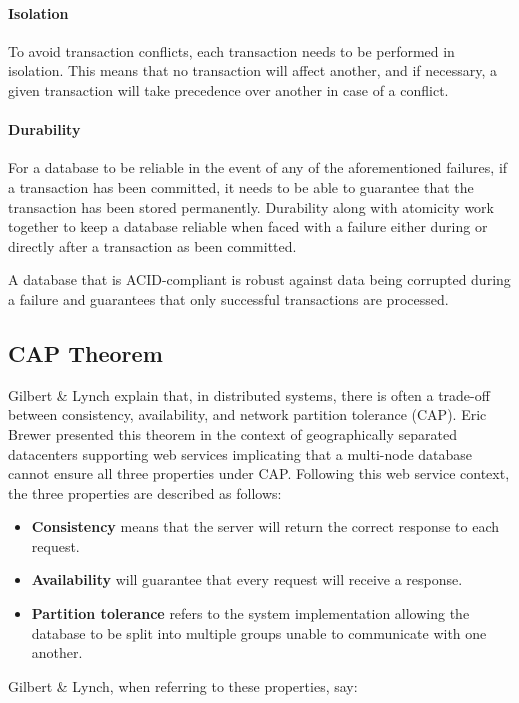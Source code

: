 \paragraph{Isolation}
To avoid transaction conflicts, each transaction needs to be performed in isolation. This means that no transaction will affect another, and if necessary, a given transaction will take precedence over another in case of a conflict.

\paragraph{Durability}
For a database to be reliable in the event of any of the aforementioned failures, if a transaction has been committed, it needs to be able to guarantee that the transaction has been stored permanently. Durability along with atomicity work together to keep a database reliable when faced with a failure either during or directly after a transaction as been committed.

A database that is ACID-compliant is robust against data being corrupted during a failure and guarantees that only successful transactions are processed.

\subsection{CAP Theorem}
\label{cap}
Gilbert \& Lynch \cite{cap} explain that, in distributed systems, there is often a trade-off between consistency, availability, and network partition tolerance (CAP). Eric Brewer presented this theorem in the context of geographically separated datacenters supporting web services implicating that a multi-node database cannot ensure all three properties under CAP. Following this web service context, the three properties are described as follows:

\begin{itemize}
    \item \textbf{Consistency} means that the server will return the correct response to each request.
    \item \textbf{Availability} will guarantee that every request will receive a response.
    \item \textbf{Partition tolerance} refers to the system implementation allowing the database to be split into multiple groups unable to communicate with one another.
\end{itemize}

Gilbert \& Lynch, when referring to these properties, say:

